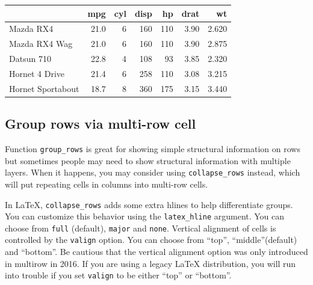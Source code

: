 \documentclass[table]{article}
\begin{document}
\begin{tabular}{lrrrrrr}
\toprule
  & mpg & cyl & disp & hp & drat & wt\\
\midrule
\hspace{1em}Mazda RX4 & 21.0 & 6 & 160 & 110 & 3.90 & 2.620\\
Mazda RX4 Wag & 21.0 & 6 & 160 & 110 & 3.90 & 2.875\\
\hspace{1em}Datsun 710 & 22.8 & 4 & 108 & 93 & 3.85 & 2.320\\
Hornet 4 Drive & 21.4 & 6 & 258 & 110 & 3.08 & 3.215\\
\hspace{1em}Hornet Sportabout & 18.7 & 8 & 360 & 175 & 3.15 & 3.440\\
\bottomrule
\end{tabular}

\hypertarget{group-rows-via-multi-row-cell}{%
\subsection{Group rows via multi-row
cell}\label{group-rows-via-multi-row-cell}}

Function \texttt{group\_rows} is great for showing simple structural
information on rows but sometimes people may need to show structural
information with multiple layers. When it happens, you may consider
using \texttt{collapse\_rows} instead, which will put repeating cells in
columns into multi-row cells.

In LaTeX, \texttt{collapse\_rows} adds some extra hlines to help
differentiate groups. You can customize this behavior using the
\texttt{latex\_hline} argument. You can choose from \texttt{full}
(default), \texttt{major} and \texttt{none}. Vertical alignment of cells
is controlled by the \texttt{valign} option. You can choose from
``top'', ``middle''(default) and ``bottom''. Be cautious that the
vertical alignment option was only introduced in multirow in 2016. If
you are using a legacy LaTeX distribution, you will run into trouble if
you set \texttt{valign} to be either ``top'' or ``bottom''.
\end{document}
